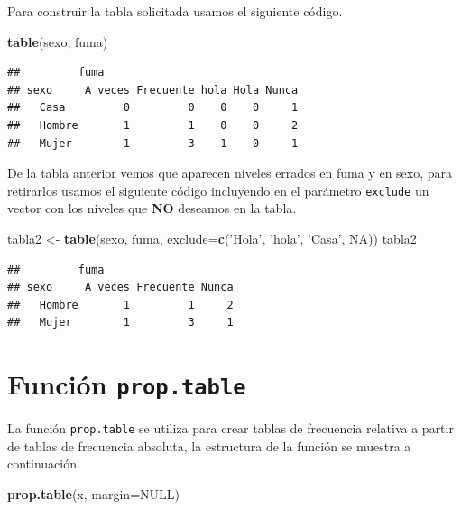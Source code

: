 \documentclass[10pt,]{krantz}
\makeatletter
\newenvironment{Shaded}{\begin{snugshade}}{\end{snugshade}}
\newcommand{\KeywordTok}[1]{\textcolor[rgb]{0.13,0.29,0.53}{\textbf{#1}}}
\newcommand{\DataTypeTok}[1]{\textcolor[rgb]{0.13,0.29,0.53}{#1}}
\newcommand{\StringTok}[1]{\textcolor[rgb]{0.31,0.60,0.02}{#1}}
\newcommand{\OtherTok}[1]{\textcolor[rgb]{0.56,0.35,0.01}{#1}}
\newcommand{\NormalTok}[1]{#1}
\newenvironment{kframe}{%
\medskip{}
\setlength{\fboxsep}{.8em}
 \def\at@end@of@kframe{}%
 \ifinner\ifhmode%
  \def\at@end@of@kframe{\end{minipage}}%
  \begin{minipage}{\columnwidth}%
 \fi\fi%
 \def\FrameCommand##1{\hskip\@totalleftmargin \hskip-\fboxsep
 \colorbox{shadecolor}{##1}\hskip-\fboxsep
     \hskip-\linewidth \hskip-\@totalleftmargin \hskip\columnwidth}%
 \MakeFramed {\advance\hsize-\width
   \@totalleftmargin\z@ \linewidth\hsize
   \@setminipage}}%
 {\par\unskip\endMakeFramed%
 \at@end@of@kframe}
\renewenvironment{Shaded}{\begin{kframe}}{\end{kframe}}
\makeatother
\begin{document}
Para construir la tabla solicitada usamos el siguiente código.

\begin{Shaded}
\begin{Highlighting}[]
\KeywordTok{table}\NormalTok{(sexo, fuma)}
\end{Highlighting}
\end{Shaded}

\begin{verbatim}
##         fuma
## sexo     A veces Frecuente hola Hola Nunca
##   Casa         0         0    0    0     1
##   Hombre       1         1    0    0     2
##   Mujer        1         3    1    0     1
\end{verbatim}

De la tabla anterior vemos que aparecen niveles errados en fuma y en
sexo, para retirarlos usamos el siguiente código incluyendo en el
parámetro \texttt{exclude} un vector con los niveles que \textbf{NO}
deseamos en la tabla.

\begin{Shaded}
\begin{Highlighting}[]
\NormalTok{tabla2 <-}\StringTok{ }\KeywordTok{table}\NormalTok{(sexo, fuma, }\DataTypeTok{exclude=}\KeywordTok{c}\NormalTok{(}\StringTok{'Hola'}\NormalTok{, }\StringTok{'hola'}\NormalTok{, }\StringTok{'Casa'}\NormalTok{, }\OtherTok{NA}\NormalTok{))}
\NormalTok{tabla2}
\end{Highlighting}
\end{Shaded}

\begin{verbatim}
##         fuma
## sexo     A veces Frecuente Nunca
##   Hombre       1         1     2
##   Mujer        1         3     1
\end{verbatim}

\section{\texorpdfstring{Función \texttt{prop.table}
}{Función prop.table }}\label{funcion-prop.table}

La función \texttt{prop.table} se utiliza para crear tablas de
frecuencia relativa a partir de tablas de frecuencia absoluta, la
estructura de la función se muestra a continuación.

\begin{Shaded}
\begin{Highlighting}[]
\KeywordTok{prop.table}\NormalTok{(x, }\DataTypeTok{margin=}\OtherTok{NULL}\NormalTok{)}
\end{Highlighting}
\end{Shaded}
\end{document}
